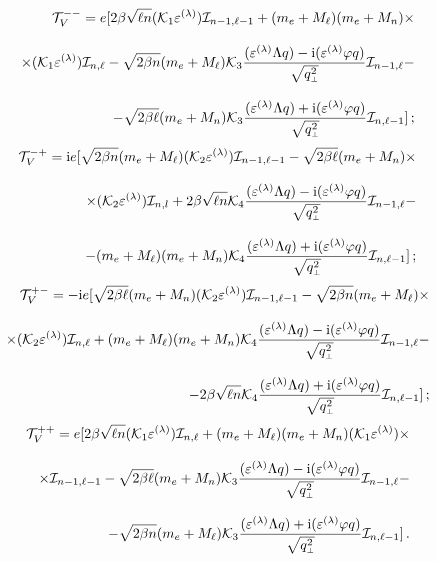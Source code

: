 \begin{eqnarray}
\nonumber
&&{\cal T}^{--}_V  = e [ 2\beta\sqrt{\ell n} ({\cal K}_1 
\varepsilon^{(\lambda)}) {\cal I}_{n-1,\ell-1} +
(m_e+M_\ell)(m_e+M_n)\times
\\[3mm]
\label{V--}
&&\times({\cal K}_1 \varepsilon^{(\lambda)}) {\cal I}_{n,\ell} -
\sqrt{2\beta n} (m_e+M_\ell) {\cal K}_3 \frac{(\varepsilon^{(\lambda)}\Lambda 
q) - 
\mathrm{i} (\varepsilon^{(\lambda)} \varphi q)}{\sqrt{q^2_{\mbox{\tiny $\bot$}}}} {\cal I}_{n-1,\ell} -
\\[3mm]
\nonumber
&& - \sqrt{2\beta \ell} (m_e+M_n) {\cal K}_3 
\frac{(\varepsilon^{(\lambda)}\Lambda q) + \mathrm{i} (\varepsilon^{(\lambda)}\varphi q)}{\sqrt{q^2_{\mbox{\tiny $\bot$}}}} {\cal I}_{n,\ell-1}] \, ;
\end{eqnarray}
%
\begin{eqnarray}
\nonumber
&&{\cal T}^{-+}_V = \mathrm{i} e [\sqrt{2\beta n} (m_e+M_\ell) ({\cal K}_2 
\varepsilon^{(\lambda)}) 
{\cal I}_{n-1,\ell-1} - 
 \sqrt{2\beta \ell} (m_e+M_n) \times
\\[3mm]
\label{eq:tV-+}
&&\times  ({\cal K}_2 \varepsilon^{(\lambda)}) 
{\cal I}_{n,l} + 2\beta\sqrt{\ell n} {\cal K}_4 
\frac{(\varepsilon^{(\lambda)}\Lambda q) - \mathrm{i} (\varepsilon^{(\lambda)} \varphi q)}{\sqrt{q^2_{\mbox{\tiny $\bot$}}}} {\cal I}_{n-1,\ell} -
\\[3mm]
\nonumber
&&- (m_e+M_\ell)(m_e+M_n) {\cal K}_4 
\frac{(\varepsilon^{(\lambda)}\Lambda q) + \mathrm{i} (\varepsilon^{(\lambda)}\varphi q)}{\sqrt{q^2_{\mbox{\tiny $\bot$}}}} {\cal I}_{n,\ell-1}]  \, ;
\end{eqnarray}
%
\begin{eqnarray}
\nonumber
&&{\cal T}^{+-}_V = -\mathrm{i} e [\sqrt{2\beta \ell} (m_e+M_n) ({\cal K}_2 
\varepsilon^{(\lambda)}) 
{\cal I}_{n-1,\ell-1} - 
 \sqrt{2\beta n} (m_e+M_\ell) \times
\\[3mm]
\label{eq:tV+-}
&&\times  ({\cal K}_2 \varepsilon^{(\lambda)}) 
{\cal I}_{n,\ell} + (m_e+M_\ell)(m_e+M_n) {\cal K}_4 
\frac{(\varepsilon^{(\lambda)}\Lambda q) - \mathrm{i} (\varepsilon^{(\lambda)} \varphi q)}{\sqrt{q^2_{\mbox{\tiny $\bot$}}}} {\cal I}_{n-1,\ell} -
\\[3mm]
\nonumber
&&- 2\beta\sqrt{\ell n} {\cal K}_4 
\frac{(\varepsilon^{(\lambda)}\Lambda q) + \mathrm{i} (\varepsilon^{(\lambda)} \varphi q)}{\sqrt{q^2_{\mbox{\tiny $\bot$}}}} {\cal I}_{n,\ell-1}]  \, ;
\end{eqnarray}
%
\begin{eqnarray}
\nonumber
&&{\cal T}^{++}_V  = e [2\beta\sqrt{\ell n} ({\cal K}_1 
\varepsilon^{(\lambda)}) {\cal I}_{n,\ell} +
 (m_e+M_\ell)(m_e+M_n) ({\cal K}_1 \varepsilon^{(\lambda)}) \times
\\[3mm]
\label{eq:tV++} 
&&\times  {\cal I}_{n-1,\ell-1} - \sqrt{2\beta \ell} (m_e+M_n) {\cal K}_3 
\frac{(\varepsilon^{(\lambda)}\Lambda q) - \mathrm{i} (\varepsilon^{(\lambda)}\varphi q)}{\sqrt{q^2_{\mbox{\tiny $\bot$}}}} {\cal I}_{n-1,\ell} -
\\[3mm]
\nonumber
&&- \sqrt{2\beta n} (m_e+M_\ell) {\cal K}_3 
\frac{(\varepsilon^{(\lambda)}\Lambda q) + \mathrm{i} (\varepsilon^{(\lambda)} \varphi q)}{\sqrt{q^2_{\mbox{\tiny $\bot$}}}} {\cal I}_{n,\ell-1}] \, .
\end{eqnarray}
